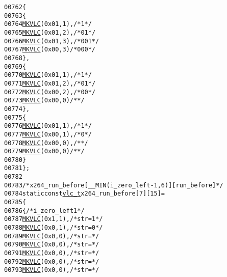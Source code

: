 \begin{footnotesize}
\begin{alltt}
00762 \{
00763     \{
00764         \hyperlink{vlc_8h_aa680b26539d09b5954221ff39a127faa}{MKVLC}( 0x01, 1 ), \textcolor{comment}{/* 1  */}
00765         \hyperlink{vlc_8h_aa680b26539d09b5954221ff39a127faa}{MKVLC}( 0x01, 2 ), \textcolor{comment}{/* 01 */}
00766         \hyperlink{vlc_8h_aa680b26539d09b5954221ff39a127faa}{MKVLC}( 0x01, 3 ), \textcolor{comment}{/* 001*/}
00767         \hyperlink{vlc_8h_aa680b26539d09b5954221ff39a127faa}{MKVLC}( 0x00, 3 )  \textcolor{comment}{/* 000*/}
00768     \},
00769     \{
00770         \hyperlink{vlc_8h_aa680b26539d09b5954221ff39a127faa}{MKVLC}( 0x01, 1 ), \textcolor{comment}{/* 1  */}
00771         \hyperlink{vlc_8h_aa680b26539d09b5954221ff39a127faa}{MKVLC}( 0x01, 2 ), \textcolor{comment}{/* 01 */}
00772         \hyperlink{vlc_8h_aa680b26539d09b5954221ff39a127faa}{MKVLC}( 0x00, 2 ), \textcolor{comment}{/* 00 */}
00773         \hyperlink{vlc_8h_aa680b26539d09b5954221ff39a127faa}{MKVLC}( 0x00, 0 )  \textcolor{comment}{/*    */}
00774     \},
00775     \{
00776         \hyperlink{vlc_8h_aa680b26539d09b5954221ff39a127faa}{MKVLC}( 0x01, 1 ), \textcolor{comment}{/* 1  */}
00777         \hyperlink{vlc_8h_aa680b26539d09b5954221ff39a127faa}{MKVLC}( 0x00, 1 ), \textcolor{comment}{/* 0  */}
00778         \hyperlink{vlc_8h_aa680b26539d09b5954221ff39a127faa}{MKVLC}( 0x00, 0 ), \textcolor{comment}{/*    */}
00779         \hyperlink{vlc_8h_aa680b26539d09b5954221ff39a127faa}{MKVLC}( 0x00, 0 )  \textcolor{comment}{/*    */}
00780     \}
00781 \};
00782 
00783 \textcolor{comment}{/* x264\_run\_before[\_\_MIN( i\_zero\_left -1, 6 )][run\_before] */}
00784 \textcolor{keyword}{static} \textcolor{keyword}{const} \hyperlink{structvlc__t}{vlc_t} x264\_run\_before[7][15] =
00785 \{
00786     \{ \textcolor{comment}{/* i\_zero\_left 1 */}
00787         \hyperlink{vlc_8h_aa680b26539d09b5954221ff39a127faa}{MKVLC}( 0x1, 1 ), \textcolor{comment}{/* str=1 */}
00788         \hyperlink{vlc_8h_aa680b26539d09b5954221ff39a127faa}{MKVLC}( 0x0, 1 ), \textcolor{comment}{/* str=0 */}
00789         \hyperlink{vlc_8h_aa680b26539d09b5954221ff39a127faa}{MKVLC}( 0x0, 0 ), \textcolor{comment}{/* str= */}
00790         \hyperlink{vlc_8h_aa680b26539d09b5954221ff39a127faa}{MKVLC}( 0x0, 0 ), \textcolor{comment}{/* str= */}
00791         \hyperlink{vlc_8h_aa680b26539d09b5954221ff39a127faa}{MKVLC}( 0x0, 0 ), \textcolor{comment}{/* str= */}
00792         \hyperlink{vlc_8h_aa680b26539d09b5954221ff39a127faa}{MKVLC}( 0x0, 0 ), \textcolor{comment}{/* str= */}
00793         \hyperlink{vlc_8h_aa680b26539d09b5954221ff39a127faa}{MKVLC}( 0x0, 0 ), \textcolor{comment}{/* str= */}

\end{alltt}
\end{footnotesize}
